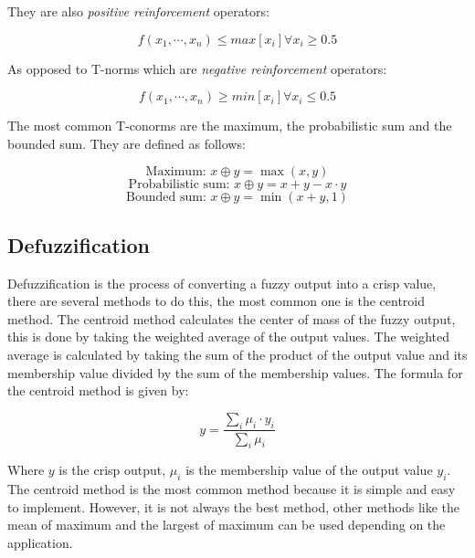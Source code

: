 They are also \textit{positive reinforcement} operators:

\begin{equation}
	f(x_1, \cdots, x_n) \leq max[x_i] \forall x_i \geq 0.5
\end{equation}

As opposed to T-norms which are \textit{negative reinforcement} operators:

\begin{equation}
	f(x_1, \cdots, x_n) \geq min[x_i] \forall x_i \leq 0.5
\end{equation}

The most common T-conorms are the maximum, the probabilistic sum and the bounded sum. They are defined as follows:

\begin{minipage}{0.9685\textwidth}
	\begin{equation}
		\text{Maximum: } x \oplus y = \max(x, y)
	\end{equation}
	\begin{equation}
		\text{Probabilistic sum: } x \oplus y = x + y - x \cdot y
	\end{equation}
	\begin{equation}
		\text{Bounded sum: } x \oplus y = \min(x + y, 1)
	\end{equation}
\end{minipage}

\subsection{Defuzzification}

Defuzzification is the process of converting a fuzzy output into a crisp value, there are several methods to do this,
the most common one is the centroid method. The centroid method calculates the center of mass of the fuzzy output, this
is done by taking the weighted average of the output values. The weighted average is calculated by taking the sum of
the product of the output value and its membership value divided by the sum of the membership values. The formula for
the centroid method is given by:

\begin{equation}
	y = \frac{\sum_{i} \mu_i \cdot y_i}{\sum_{i} \mu_i}
\end{equation}

Where $y$ is the crisp output, $\mu_i$ is the membership value of the output value $y_i$. The centroid method is the
most common method because it is simple and easy to implement. However, it is not always the best method, other methods
like the mean of maximum and the largest of maximum can be used depending on the application.

